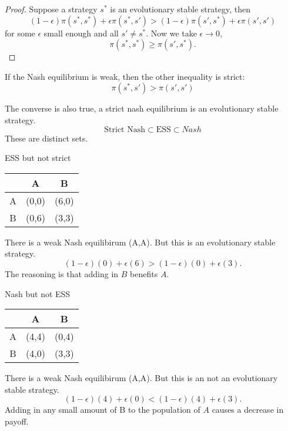 \begin{proof}
    Suppose a strategy $s^*$ is an evolutionary stable strategy, then \[
        (1-\epsilon)\pi(s^*,s^*)+\epsilon \pi(s^*,s')>
        (1-\epsilon)\pi(s',s^*)+\epsilon\pi(s',s')
        \]
        for some $\epsilon$ small enough and all $s'\neq s^*$.
        Now we take $\epsilon\to 0 $,\[
            \pi(s^*,s^*)\geq\pi(s',s^*).
        \]
\end{proof}
\begin{remark}
    If the Nash equilibrium is weak, then the other inequality is strict:\[
        \pi(s^*,s')>
       \pi(s',s')
    \]
\end{remark}

The converse is also true, a strict nash equilibrium is an evolutionary stable strategy. \[
\textrm{Strict Nash} \subset \textrm{ESS} \subset {Nash}
\]
These are distinct sets.\begin{aexample}{ESS but not strict}{}
    \begin{center}
        \begin{tabular}{|c|c c|} 
            \hline &A& B \\
            
            \hline
            A&(0,0)&(6,0)\\
            \hline B&(0,6)&(3,3)
            \\ \hline
        \end{tabular}
    \end{center}
    There is a weak Nash equilibirum (A,A). But this is an evolutionary stable strategy. \[
    (1-\epsilon)(0)+\epsilon(6)> (1-\epsilon)(0) + \epsilon(3).
    \]
    The reasoning is that adding in $B$ benefits $A$.
\end{aexample}
\begin{aexample}{Nash but not ESS}{}
    \begin{center}
        \begin{tabular}{|c|c c|} 
            \hline &A& B \\
            
            \hline
            A&(4,4)&(0,4)\\
            \hline B&(4,0)&(3,3)
            \\ \hline
        \end{tabular}
    \end{center}
    There is a weak Nash equilibirum (A,A). But this is an not an evolutionary stable strategy. \[
    (1-\epsilon)(4)+\epsilon(0)<(1-\epsilon)(4) + \epsilon(3).
    \]
    Adding in any small amount of B to the population of $A$ causes a decrease in payoff.
\end{aexample}
